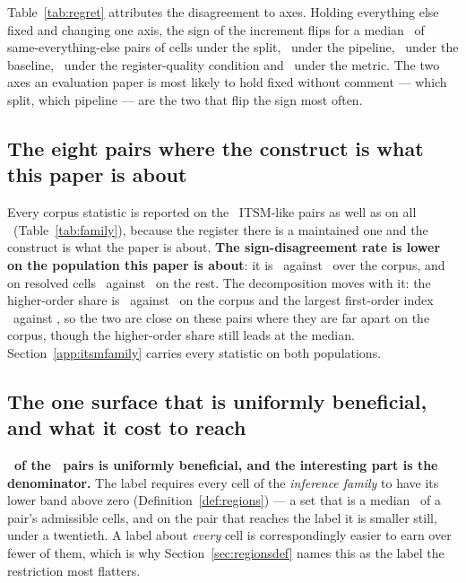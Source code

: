 Table~\ref{tab:regret} attributes the disagreement to axes. Holding everything
else fixed and changing one axis, the sign of the increment flips for a median
\flipSplitPct\ of same-everything-else pairs of cells under the split,
\flipLearnerPct\ under the pipeline, \flipRungPct\ under the baseline,
\flipQualityPct\ under the register-quality condition and \flipMetricPct\
under the metric. The two axes an evaluation paper is most likely to hold
fixed without comment --- which split, which pipeline --- are the two that
flip the sign most often.

\subsection{The eight pairs where the construct is what this paper is about}
\label{sec:family}

Every corpus statistic is reported on the \nItsmPairs\ ITSM-like pairs as
well as on all \nPairs\ (Table~\ref{tab:family}), because the register there
is a maintained one and the construct is what the paper is about.
\textbf{The sign-disagreement rate is lower on the population this paper is
about}: it is \misreportItsmPct\ against \misreportEqualPct\ over
the corpus, and on resolved cells \misreportPooledItsmPct\ against
\misreportPooledOtherPct\ on the rest. The decomposition moves with it: the
higher-order share is \itsmHigherOrderPct\ against \interactionTotalPct\ on
the corpus and the largest first-order index \itsmLargestFirstOrderPct\
against \largestFirstOrderPct, so the two are close on these pairs where
they are far apart on the corpus, though the higher-order share still leads
at the median.
Section~\ref{app:itsmfamily} carries every statistic on both populations.

\subsection{The one surface that is uniformly beneficial, and what it cost to
reach}
\label{app:uniformly}

\textbf{\nUniformlyBeneficial\ of the \nPairs\ pairs is uniformly
beneficial, and the interesting part is the denominator.} The label requires
every cell of the \emph{inference family} to have its lower band above zero
(Definition~\ref{def:regions}) --- a set that is a median
\inferenceShareAdmissibleMedianPct\ of a pair's admissible cells, and on the
pair that reaches the label it is smaller still, under a twentieth. A label
about \emph{every} cell is correspondingly easier to earn over fewer of them,
which is why Section~\ref{sec:regionsdef} names this as the label the
restriction most flatters.

